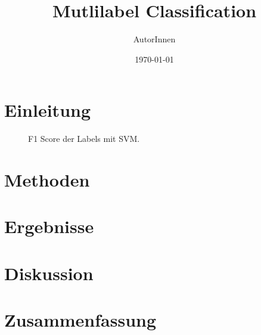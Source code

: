 \documentclass{scrartcl}
\title{Mutlilabel Classification}
\author{AutorInnen}
\date{\today}
\begin{document}
\maketitle

\begin{abstract}
    \lipsum[11]
\end{abstract}

\tableofcontents

\section{Einleitung}
\begin{figure}
    \centering
    \def\svgwidth{0.5\columnwidth}
    
    \caption{F1 Score der Labels mit SVM.}
\end{figure}
\lipsum[1]
\section{Methoden}
\lipsum[2]
\section{Ergebnisse}
\lipsum[3]
\section{Diskussion}
\lipsum[4]
\section{Zusammenfassung}
\lipsum[5]


\nocite{*}



\end{document}
